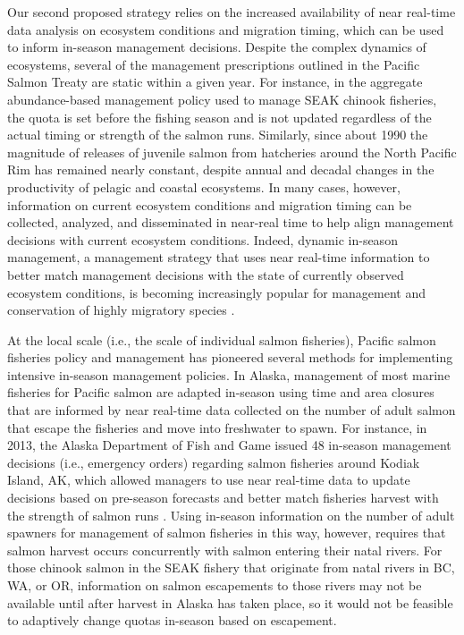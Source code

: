 Our second proposed strategy relies on the increased availability of
near real-time data analysis on ecosystem conditions and migration
timing, which can be used to inform in-season management decisions.
Despite the complex dynamics of ecosystems, several of the management
prescriptions outlined in the Pacific Salmon Treaty are static within a
given year. For instance, in the aggregate abundance-based management
policy used to manage SEAK chinook fisheries, the quota is set before
the fishing season and is not updated regardless of the actual timing or
strength of the salmon runs. Similarly, since about 1990 the magnitude
of releases of juvenile salmon from hatcheries around the North Pacific
Rim has remained nearly constant, despite annual and decadal changes in
the productivity of pelagic and coastal ecosystems. In many cases,
however, information on current ecosystem conditions and migration
timing can be collected, analyzed, and disseminated in near-real time to
help align management decisions with current ecosystem conditions.
Indeed, dynamic in-season management, a management strategy that uses
near real-time information to better match management decisions with the
state of currently observed ecosystem conditions, is becoming
increasingly popular for management and conservation of highly migratory
species \citep{Maxwell2015, Lewison2015}.

At the local scale (i.e., the scale of individual salmon fisheries),
Pacific salmon fisheries policy and management has pioneered several
methods for implementing intensive in-season management policies. In
Alaska, management of most marine fisheries for Pacific salmon are
adapted in-season using time and area closures that are informed by near
real-time data collected on the number of adult salmon that escape the
fisheries and move into freshwater to spawn. For instance, in 2013, the
Alaska Department of Fish and Game issued 48 in-season management
decisions (i.e., emergency orders) regarding salmon fisheries around
Kodiak Island, AK, which allowed managers to use near real-time data to
update decisions based on pre-season forecasts and better match
fisheries harvest with the strength of salmon runs \citep{Jackson2013}.
Using in-season information on the number of adult spawners for
management of salmon fisheries in this way, however, requires that
salmon harvest occurs concurrently with salmon entering their natal
rivers. For those chinook salmon in the SEAK fishery that originate from
natal rivers in BC, WA, or OR, information on salmon escapements to
those rivers may not be available until after harvest in Alaska has
taken place, so it would not be feasible to adaptively change quotas
in-season based on escapement.


